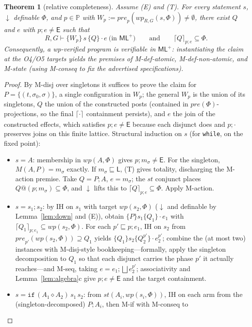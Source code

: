\documentclass[11pt]{article}
\theoremstyle{plain}
\newtheorem{theorem}{Theorem}
\theoremstyle{plain}
\theoremstyle{definition}
\newcommand{\Phase}{\mathbb{P}}
\newcommand{\ML}{\mathsf{L}}
\newcommand{\ME}{\mathsf{E}}
\newcommand{\sq}{\sqsubseteq}
\newcommand{\wpx}{\mathit{wp}}
\newcommand{\stp}{\mathit{st}}
\newcommand{\prep}{\mathit{pre}}
\newcommand{\upemb}[2]{\lceil #1\rceil_{#2}}     %
\newcommand{\mljud}[6]{#1,#2\vdash\{#3\}\,#4\,\{#5\}\cdot #6}
\newcommand{\dcl}{\ensuremath{\downarrow}\text{-closed}}
\newcommand{\MLplus}{\textsf{ML}^{+}}
\newcommand{\kif}{\mathtt{if}}
\newcommand{\cact}[2]{#1\diamond #2}                 %
\newcommand{\code}[1]{\texttt{#1}}
\begin{document}
\begin{theorem}[relative completeness]\label{thm:complete}
Assume (E) and (T). For every statement $s$, \dcl{} definable $\Phi$, and
$p\in\Phase$ with $W_p := \prep_p(\wpx_{R,G}(s,\Phi)) \neq \emptyset$, there exist
$Q$ and $e$ with $p;e\neq\ME$ such that
\[
\mljud{R}{G}{W_p}{s}{Q}{e}\ \text{(in $\MLplus$)}
\qquad\text{and}\qquad
\upemb{Q}{p;e}\subseteq\Phi .
\]
Consequently, a wp-verified program is verifiable in $\MLplus$: instantiating the
claim at the O4/O5 targets yields the premises of M-def-atomic,
M-def-non-atomic, and M-state (using M-conseq to fix the advertised
specifications).
\end{theorem}
\begin{proof}
By M-disj over singletons it suffices to prove the claim for
$P = \{(t,\sigma_0,\sigma)\}$, a single configuration in $W_p$; the general $W_p$
is the union of its singletons, $Q$ the union of the constructed posts (contained
in $\prep(\Phi)$-projections, so the final $\upemb{\cdot}{}$ containment persists),
and $e$ the join of the constructed effects, which satisfies $p;e\neq\ME$ because
each disjunct does and $p;\cdot$ preserves joins on this finite lattice. Structural
induction on $s$ (for \code{while}, on the fixed point):
\begin{itemize}[leftmargin=1.4em]
\item $s=A$: membership in $\wpx(A,\Phi)$ gives $p;m_\sigma\neq\ME$. For the
  singleton, $M(A,P) = m_\sigma$ exactly. If $m_\sigma\sq\ML$, (T) gives totality,
  discharging the M-action premise. Take $Q = P;A$, $e = m_\sigma$; the $\stp$
  conjunct places $Q@(p;m_\sigma)\subseteq\Phi$, and \dcl{} lifts this to
  $\upemb{Q}{p;e}\subseteq\Phi$. Apply M-action.
\item $s=s_1;s_2$: by IH on $s_1$ with target $\wpx(s_2,\Phi)$ (\dcl{} and definable
  by Lemma~\ref{lem:down} and (E)), obtain $\{P\}s_1\{Q_1\}\cdot e_1$ with
  $\upemb{Q_1}{p;e_1}\subseteq\wpx(s_2,\Phi)$. For each $p'\sq p;e_1$, IH on $s_2$
  from $\prep_{p'}(\wpx(s_2,\Phi))\supseteq Q_1$ yields $\{Q_1\}s_2\{Q^{p'}_2\}\cdot e^{p'}_2$;
  combine the (at most two) instances with M-disj-style bookkeeping---formally,
  apply the singleton decomposition to $Q_1$ so that each disjunct carries the
  phase $p'$ it actually reaches---and M-seq, taking $e = e_1;\bigsqcup e^{p'}_2$;
  associativity and Lemma~\ref{lem:algebra}c give $p;e\neq\ME$ and the target
  containment.
\item $s=\kif\,(\cact{A_1}{A_2})\,s_1\,s_2$: from $\stp(A_i,\wpx(s_i,\Phi))$, IH on
  each arm from the (singleton-decomposed) $P;A_i$, then M-if with M-conseq to

\end{itemize}
\end{proof}
\end{document}
